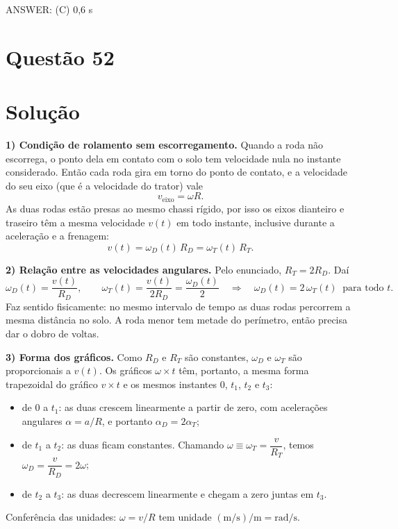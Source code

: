 \documentclass{article}%
\begin{document}
ANSWER: (C) 0,6 s%
\newpage%
\section*{Questão 52}

\section*{Solução}

\textbf{1) Condição de rolamento sem escorregamento.}
Quando a roda não escorrega, o ponto dela em contato com o solo tem velocidade nula no instante considerado. Então cada roda gira em torno do ponto de contato, e a velocidade do seu eixo (que é a velocidade do trator) vale
\[
v_{\text{eixo}} = \omega R .
\]
As duas rodas estão presas ao mesmo chassi rígido, por isso os eixos dianteiro e traseiro têm a mesma velocidade $v(t)$ em todo instante, inclusive durante a aceleração e a frenagem:
\[
v(t) = \omega_D(t)\,R_D = \omega_T(t)\,R_T .
\]

\textbf{2) Relação entre as velocidades angulares.}
Pelo enunciado, $R_T = 2R_D$. Daí
\[
\omega_D(t) = \frac{v(t)}{R_D}, \qquad \omega_T(t) = \frac{v(t)}{2R_D} = \frac{\omega_D(t)}{2}
\quad\Longrightarrow\quad \omega_D(t) = 2\,\omega_T(t)\ \text{ para todo } t .
\]
Faz sentido fisicamente: no mesmo intervalo de tempo as duas rodas percorrem a mesma distância no solo. A roda menor tem metade do perímetro, então precisa dar o dobro de voltas.

\textbf{3) Forma dos gráficos.}
Como $R_D$ e $R_T$ são constantes, $\omega_D$ e $\omega_T$ são proporcionais a $v(t)$. Os gráficos $\omega\times t$ têm, portanto, a mesma forma trapezoidal do gráfico $v\times t$ e os mesmos instantes $0$, $t_1$, $t_2$ e $t_3$:
\begin{itemize}
\item de $0$ a $t_1$: as duas crescem linearmente a partir de zero, com acelerações angulares $\alpha = a/R$, e portanto $\alpha_D = 2\alpha_T$;
\item de $t_1$ a $t_2$: as duas ficam constantes. Chamando $\omega \equiv \omega_T = \dfrac{v}{R_T}$, temos $\omega_D = \dfrac{v}{R_D} = 2\omega$;
\item de $t_2$ a $t_3$: as duas decrescem linearmente e chegam a zero juntas em $t_3$.
\end{itemize}
Conferência das unidades: $\omega = v/R$ tem unidade $(\text{m/s})/\text{m} = \text{rad/s}$.
\end{document}
